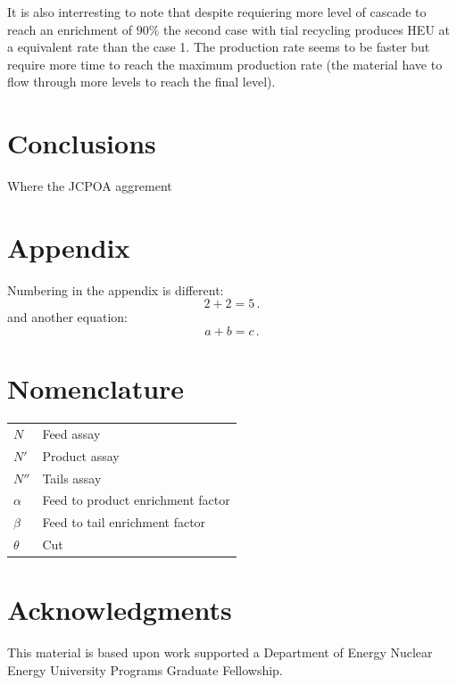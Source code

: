 \documentclass{anstrans}
\begin{document}
It is also interresting to note that despite requiering more level of cascade to
reach an enrichment of $90\%$ the second case with tial recycling produces HEU
at a equivalent rate than the case 1. The production rate seems to be faster but
require more time to reach the maximum production rate (the material have to
flow through more levels to reach the final level).


\section{Conclusions}

Where the JCPOA aggrement 

\appendix
\section{Appendix}

Numbering in the appendix is different:
\begin{equation} \label{eq:appendix}
  2 + 2 = 5\,.
\end{equation}
and another equation:
\begin{equation} \label{eq:appendix2}
  a + b = c\,.
\end{equation}

\section{Nomenclature}

\begin{table}[H]
    \centering
    \begin{tabular}{l|l}
        $N$ & Feed assay \\
        $N'$ & Product assay \\
        $N''$ & Tails assay \\
        $\alpha$ & Feed to product enrichment factor \\
        $\beta$ & Feed to tail enrichment factor \\
        $\theta$ & Cut
    \end{tabular}
    \label{tab:my_label}
\end{table}

\section{Acknowledgments}
This material is based upon work supported a Department of Energy Nuclear
Energy University Programs Graduate Fellowship.



\end{document}

